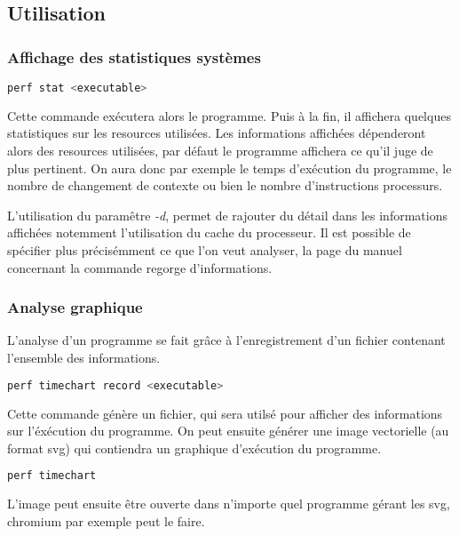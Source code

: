\documentclass[a4paper, 12pt]{article}
\begin{document}
\subsection{Utilisation}
    \subsubsection{Affichage des statistiques systèmes}
    \begin{mdframed}[backgroundcolor=light-gray, roundcorner=20pt,
        innerleftmargin=20, innertopmargin=1, innerbottommargin=1, 
        outerlinewidth=1, linecolor=darkgray]
        \begin{lstlisting}[language=Bash]
perf stat <executable>
        \end{lstlisting}
    \end{mdframed}

    Cette commande exécutera alors le programme. Puis à la fin, il affichera quelques statistiques sur les resources utilisées.
    Les informations affichées dépenderont alors des resources utilisées, par défaut le programme affichera ce qu'il juge de plus pertinent.
    On aura donc par exemple le temps d'exécution du programme, le nombre de changement de contexte ou bien le nombre d'instructions processurs.

    L'utilisation du paramêtre \emph{-d}, permet de rajouter du détail dans les informations affichées notemment l'utilisation du cache du processeur.
    Il est possible de spécifier plus précisémment ce que l'on veut analyser, la page du manuel concernant la commande regorge d'informations.
    
    \subsubsection{Analyse graphique}

    L'analyse d'un programme se fait grâce à l'enregistrement d'un fichier contenant l'ensemble des informations.
    \begin{mdframed}[backgroundcolor=light-gray, roundcorner=20pt,
        innerleftmargin=20, innertopmargin=1, innerbottommargin=1, 
        outerlinewidth=1, linecolor=darkgray]
        \begin{lstlisting}[language=Bash]
perf timechart record <executable>
        \end{lstlisting}
    \end{mdframed}
    \par
    Cette commande génère un fichier, qui sera utilsé pour afficher des informations sur l'éxécution du programme.
    On peut ensuite générer une image vectorielle (au format svg) qui contiendra un graphique d'exécution du programme.
    \begin{mdframed}[backgroundcolor=light-gray, roundcorner=20pt,
        innerleftmargin=20, innertopmargin=1, innerbottommargin=1, 
        outerlinewidth=1, linecolor=darkgray]
        \begin{lstlisting}[language=Bash]
perf timechart
        \end{lstlisting}
    \end{mdframed}
    L'image peut ensuite être ouverte dans n'importe quel programme gérant les svg, chromium par exemple peut le faire.
\end{document}
